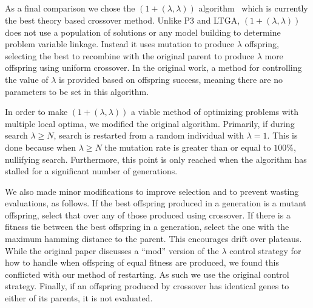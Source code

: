 \documentclass{sig-alternate}
\begin{document}
\subsection{}
As a final comparison we chose the $(1+(\lambda,\lambda))$ algorithm~\cite{doerr:2013:lambdalambda}
which is currently the best theory based crossover method.  Unlike P3 and LTGA,
$(1+(\lambda,\lambda))$ does not use a population of solutions or any model building
to determine problem variable linkage.  Instead it uses mutation to produce $\lambda$
offspring, selecting the best to recombine with the original parent to produce $\lambda$
more offspring using uniform crossover.  In the original work, a method for controlling
the value of $\lambda$ is provided based on offspring success, meaning there are no
parameters to be set in this algorithm.

In order to make $(1+(\lambda,\lambda))$ a viable method of optimizing problems
with multiple local optima, we modified the original algorithm.  Primarily, if
during search $\lambda \ge N$, search is restarted from a random individual with
$\lambda=1$.  This is done because when $\lambda \ge N$ the mutation rate is greater
than or equal to $100\%$, nullifying search.  Furthermore, this point is only reached
when the algorithm has stalled for a significant number of generations.

We also made minor modifications to improve selection and to prevent wasting evaluations, as follows.
If the best offspring produced in a generation is a mutant offspring, select that
over any of those produced using crossover.  If there is a fitness tie between the
best offspring in a generation, select the one with the maximum hamming distance
to the parent.  This encourages drift over plateaus.  While the original paper
discusses a ``mod'' version of the $\lambda$ control strategy for how to handle
when offspring of equal fitness are produced, we found this conflicted with our
method of restarting.  As such we use the original control strategy. %
Finally, if an offspring produced by crossover has identical genes to either of its parents,
it is not evaluated.
\end{document}
